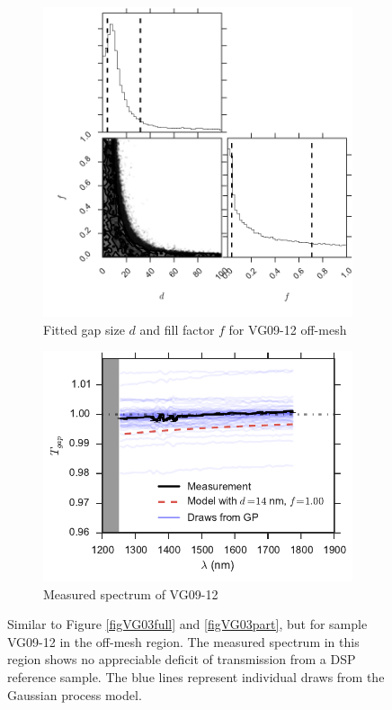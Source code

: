 \documentclass[osajnl,preprint,showpacs,superscriptaddress,12pt]{revtex4-1} %
\begin{document}
\begin{figure}[htbp]
    \centering
    \begin{subfigure}[b]{0.5\textwidth}
        \includegraphics[width=\textwidth]{figs/VG0912_0gap_corner.pdf}
        \caption{Fitted gap size $d$ and fill factor $f$ for VG09-12 off-mesh}
	\label{VG0912_0gap_corner}
    \end{subfigure}
    \begin{subfigure}[b]{0.5\textwidth}
        \includegraphics[width=\textwidth]{figs/VG0912_0gap.pdf}
        \caption{Measured spectrum of VG09-12}
        \label{VG0912_0gap}
    \end{subfigure}
\caption{Similar to Figure \ref{figVG03full} and \ref{figVG03part}, but for sample VG09-12 in the off-mesh region.  The measured spectrum in this region shows no appreciable deficit of transmission from a DSP reference sample.  The blue lines represent individual draws from the Gaussian process model.  
\label{figVG12}}
\end{figure}
\end{document}
